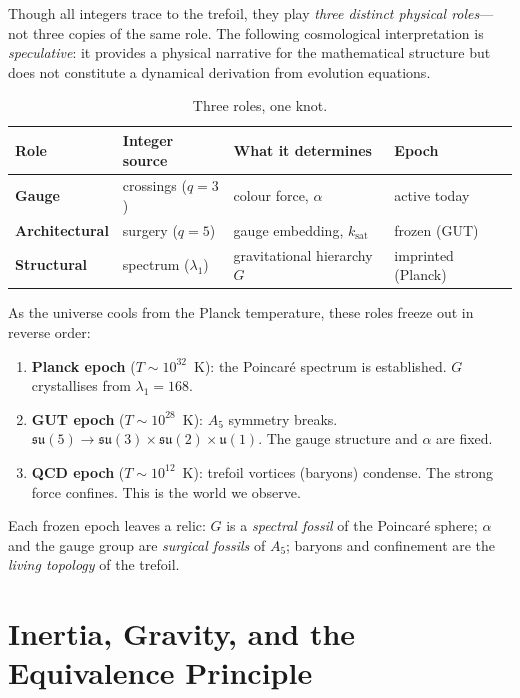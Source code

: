 \documentclass[11pt]{article}
\newcommand{\su}{\mathfrak{su}}
\begin{document}
Though all integers trace to the trefoil, they play
\emph{three distinct physical roles}---not three copies of the
same role.  The following cosmological interpretation is
\emph{speculative}: it provides a physical narrative for the
mathematical structure but does not constitute a dynamical
derivation from evolution equations.

\begin{table}[h]
\centering
\caption{Three roles, one knot.}
\label{tab:roles}
\begin{tabular}{llll}
\toprule
Role & Integer source & What it determines & Epoch \\
\midrule
\textbf{Gauge} & crossings ($q{=}3$)
  & colour force, $\alpha$ & active today \\
\textbf{Architectural} & surgery ($q{=}5$)
  & gauge embedding, $k_\text{sat}$ & frozen (GUT) \\
\textbf{Structural} & spectrum ($\lambda_1$)
  & gravitational hierarchy $G$ & imprinted (Planck) \\
\bottomrule
\end{tabular}
\end{table}

As the universe cools from the Planck temperature, these roles
freeze out in reverse order:
\begin{enumerate}\setlength\itemsep{3pt}
  \item \textbf{Planck epoch} ($T \sim 10^{32}$~K):
    the Poincar\'e spectrum is established.  $G$ crystallises
    from $\lambda_1 = 168$.

  \item \textbf{GUT epoch} ($T \sim 10^{28}$~K):
    $A_5$ symmetry breaks.
    $\su(5) \to \su(3) \times \su(2) \times \mathfrak{u}(1)$.
    The gauge structure and $\alpha$ are fixed.

  \item \textbf{QCD epoch} ($T \sim 10^{12}$~K):
    trefoil vortices (baryons) condense.  The strong force
    confines.  This is the world we observe.
\end{enumerate}

Each frozen epoch leaves a relic:
$G$ is a \emph{spectral fossil} of the Poincar\'e sphere;
$\alpha$ and the gauge group are \emph{surgical fossils}
of $A_5$;
baryons and confinement are the \emph{living topology} of the
trefoil.


\section{Inertia, Gravity, and the Equivalence Principle}
\label{sec:equivalence}
\end{document}
